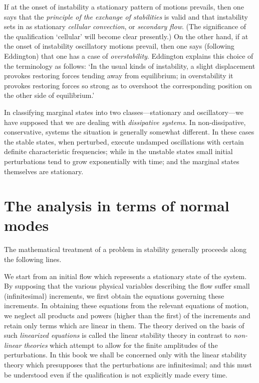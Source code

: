If at the onset of instability a stationary pattern of motions prevails,
then one says that the \emph{principle of the exchange of stabilities} is valid and
that instability sets in as stationary \emph{cellular convection}, or \emph{secondary
flow}.  (The significance of the qualification `cellular' will become clear
presently.)  On the other hand, if at the onset of instability oscillatory
motions prevail, then one says (following Eddington) that one has a
case of \emph{overstability}.  Eddington explains this choice of the terminology
as follows: `In the usual kinds of instability, a slight displacement
provokes restoring forces tending away from equilibrium; in overstability
it provokes restoring forces so strong as to overshoot the corresponding
position on the other side of equilibrium.'

In classifying marginal states into two classes---stationary and
oscillatory---we have supposed that we are dealing with \emph{dissipative
systems}.  In non-dissipative, conservative, systems the situation is
generally somewhat different.  In these cases the stable states, when
perturbed, execute undamped oscillations with certain definite characteristic frequencies; while in the unstable states small initial perturbations tend to grow exponentially with time; and the marginal states
themselves are stationary.

\section{The analysis in terms of normal modes}
\label{sec:1-3}

The mathematical treatment of a problem in stability generally
proceeds along the following lines.

We start from an initial flow which represents a stationary state of
the system.  By supposing that the various physical variables describing
the flow suffer small (infinitesimal) increments, we first obtain the
equations governing these increments.  In obtaining these equations
from the relevant equations of motion, we neglect all products and
powers (higher than the first) of the increments and retain only terms
which are linear in them.  The theory derived on the basis of such
\emph{linearized equations} is called the linear stability theory in contrast to
\emph{non-linear theories} which attempt to allow for the finite amplitudes of
the perturbations.  In this book we shall be concerned only with the
linear stability theory which presupposes that the perturbations are
infinitesimal; and this must be understood even if the qualification is
not explicitly made every time.

